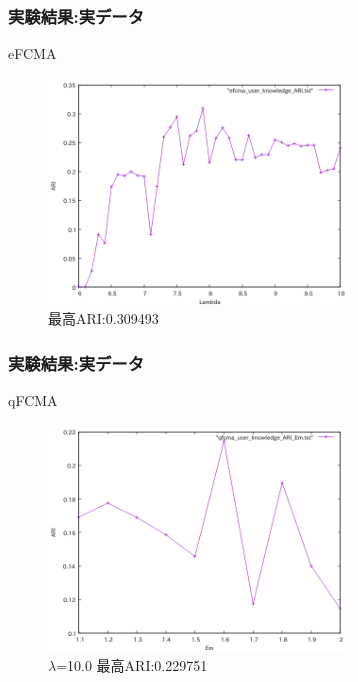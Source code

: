 \documentclass[13pt,dvipdfmx]{beamer}
\begin{document}
\begin{frame}\frametitle{実験結果:実データ}
  \begin{block}{eFCMA}
   \begin{figure}[htbp]
    \begin{center}
     \includegraphics[height=60mm]{efcma_ARI.png}
   \end{center}
   \captionsetup{labelformat=empty,labelsep=none}
   \caption{最高ARI:0.309493}
  \end{figure}
 \end{block}
\end{frame}


\begin{frame}\frametitle{実験結果:実データ}
  \begin{block}{qFCMA}
   \begin{figure}[htbp]
    \begin{center}
    \includegraphics[height=60mm]{qfcma_ARI_Em.png}
   \end{center}
   \captionsetup{labelformat=empty,labelsep=none}
   \caption{$\lambda$=10.0  最高ARI:0.229751}
  \end{figure}
 \end{block}
\end{frame}
\end{document}
